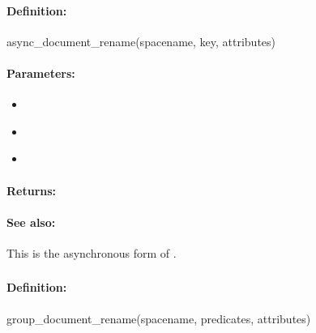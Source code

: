 \paragraph{Definition:}
\begin{rubycode}
async_document_rename(spacename, key, attributes)
\end{rubycode}

\paragraph{Parameters:}
\begin{itemize}[noitemsep]
\item {}\\

\item {}\\

\item {}\\

\end{itemize}

\paragraph{Returns:}


\paragraph{See also:}  This is the asynchronous form of .

\pagebreak
\subsubsection{}
\label{api:ruby:group_document_rename}


\paragraph{Definition:}
\begin{rubycode}
group_document_rename(spacename, predicates, attributes)
\end{rubycode}

